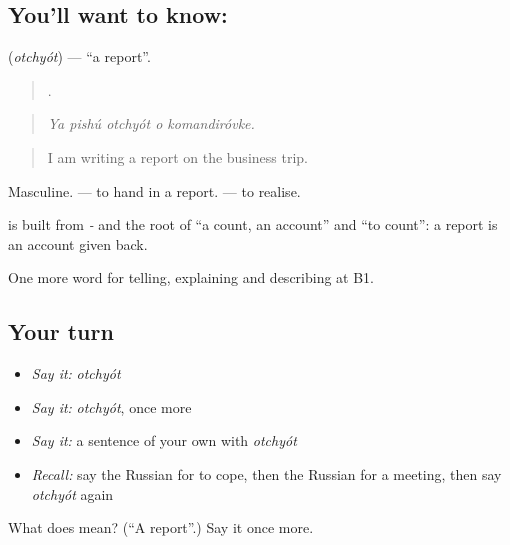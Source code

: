 \subsection*{You'll want to know: }
\textbf{} (\emph{otchyót}) — \textquotedblleft{}a report\textquotedblright{}.

\begin{quote}
    .
\end{quote}

\begin{quote}
\emph{Ya pishú otchyót o komandiróvke.}
\end{quote}

\begin{quote}
I am writing a report on the business trip.
\end{quote}

Masculine. \emph{ } — to hand in a report. \emph{  } — to realise.

\begin{cousinweb}
\textbf{} is built from \emph{-} and the root of \emph{} \textquotedblleft{}a count, an account\textquotedblright{} and \emph{} \textquotedblleft{}to count\textquotedblright{}: a report is an account given back.
\end{cousinweb}

\begin{grammarlens}[title={What you've built}]
One more word for telling, explaining and describing at B1.
\end{grammarlens}

\subsection*{Your turn}
\begin{itemize}
\raggedright
  \item \emph{Say it:} \emph{otchyót}
  \item \emph{Say it:} \emph{otchyót}, once more
  \item \emph{Say it:} a sentence of your own with \emph{otchyót}
  \item \emph{Recall:} say the Russian for to cope, then the Russian for a meeting, then say \emph{otchyót} again
\end{itemize}

\begin{tcolorbox}[breakable,colback=teal!4,colframe=teal!35!black,title={Before you move on}]
What does  mean? (\textquotedblleft{}A report\textquotedblright{}.) Say it once more.
\end{tcolorbox}
